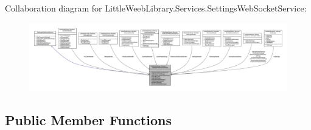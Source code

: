 Collaboration diagram for Little\+Weeb\+Library.\+Services.\+Settings\+Web\+Socket\+Service\+:\nopagebreak
\begin{figure}[H]
\begin{center}
\leavevmode
\includegraphics[width=350pt]{class_little_weeb_library_1_1_services_1_1_settings_web_socket_service__coll__graph}
\end{center}
\end{figure}
\subsection*{Public Member Functions}

